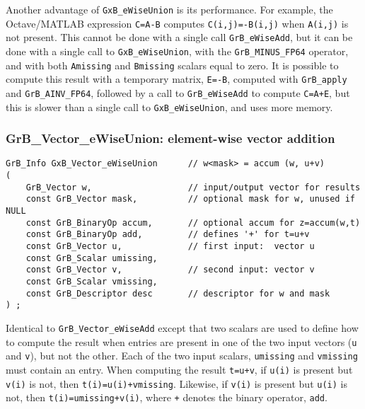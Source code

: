 \documentclass[12pt]{article}
\begin{document}
Another advantage of \verb'GxB_eWiseUnion' is its performance.  For example,
the Octave/MATLAB expression \verb'C=A-B' computes \verb'C(i,j)=-B(i,j)' when
\verb'A(i,j)' is not present.  This cannot be done with a single call
\verb'GrB_eWiseAdd', but it can be done with a single call to
\verb'GxB_eWiseUnion', with the \verb'GrB_MINUS_FP64' operator, and with both
\verb'Amissing' and \verb'Bmissing' scalars equal to zero.  It is possible to
compute this result with a temporary matrix, \verb'E=-B', computed with
\verb'GrB_apply' and \verb'GrB_AINV_FP64', followed by a call to
\verb'GrB_eWiseAdd' to compute \verb'C=A+E', but this is slower than a single
call to \verb'GxB_eWiseUnion', and uses more memory.

\newpage
\subsubsection{{\sf GrB\_Vector\_eWiseUnion:} element-wise vector addition}
\label{eWiseUnion_matrix}

\begin{mdframed}[userdefinedwidth=6in]
{\footnotesize
\begin{verbatim}
GrB_Info GxB_Vector_eWiseUnion      // w<mask> = accum (w, u+v)
(
    GrB_Vector w,                   // input/output vector for results
    const GrB_Vector mask,          // optional mask for w, unused if NULL
    const GrB_BinaryOp accum,       // optional accum for z=accum(w,t)
    const GrB_BinaryOp add,         // defines '+' for t=u+v
    const GrB_Vector u,             // first input:  vector u
    const GrB_Scalar umissing,
    const GrB_Vector v,             // second input: vector v
    const GrB_Scalar vmissing,
    const GrB_Descriptor desc       // descriptor for w and mask
) ;
\end{verbatim} } \end{mdframed}

Identical to \verb'GrB_Vector_eWiseAdd' except that two scalars are used
to define how to compute the result when entries are present in one of
the two input vectors (\verb'u' and \verb'v'), but not the other.
Each of the two input scalars, \verb'umissing' and \verb'vmissing'
must contain an entry.
When computing the result \verb't=u+v',
if \verb'u(i)' is present but \verb'v(i)' is not, then \verb't(i)=u(i)+vmissing'.
Likewise,
if \verb'v(i)' is present but \verb'u(i)' is not, then \verb't(i)=umissing+v(i)',
where \verb'+' denotes the binary operator, \verb'add'.
\end{document}
